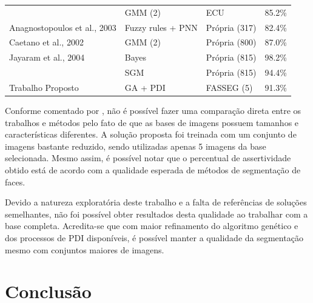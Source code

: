\documentclass[12pt,oneside,a4paper,english,french,spanish,brazil,]{abntex2}
\begin{document}
\begin{table}
\begin{tabular}{llll}
                             & GMM (2)                        & ECU                   & 85.2\%              \\
Anagnostopoulos et al., 2003 & Fuzzy rules + PNN               & Própria (317) & 82.4\%              \\
Caetano et al., 2002         & GMM (2)                        & Própria (800) & 87.0\%              \\
Jayaram et al., 2004         & Bayes                          & Própria (815) & 98.2\%              \\
                             & SGM                            & Própria (815) & 94.4\%              \\
Trabalho Proposto            & GA + PDI                       & FASSEG (5)    & 91.3\% \\ \hline           
\end{tabular}
\end{table}

Conforme comentado por \citet{kakumanu:2007}, não é possível fazer uma comparação direta entre os trabalhos e métodos pelo fato de que as bases de imagens possuem tamanhos e características diferentes. A solução proposta foi treinada com um conjunto de imagens bastante reduzido, sendo utilizadas apenas 5 imagens da base selecionada. Mesmo assim, é possível notar que o percentual de assertividade obtido está de acordo com a qualidade esperada de métodos de segmentação de faces.

Devido a natureza exploratória deste trabalho e a falta de referências de soluções semelhantes, não foi possível obter resultados desta qualidade ao trabalhar com a base completa. Acredita-se que com maior refinamento do algoritmo genético e dos processos de PDI disponíveis, é possível manter a qualidade da segmentação mesmo com conjuntos maiores de imagens.


% 

\chapter{Conclusão}
\label{chap:Conclusao}
\label{chap:ultimo}
\end{document}
